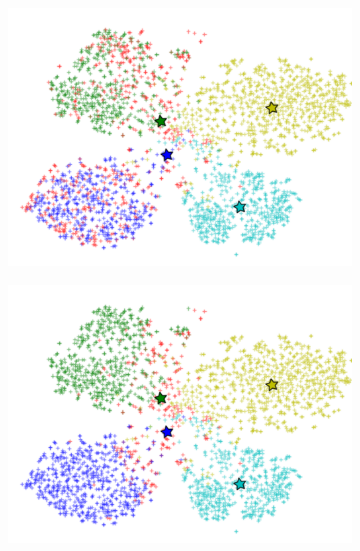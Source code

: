 \begin{figure}[t]
\begin{subfigure}[b]{0.38\linewidth}
    \includegraphics[width=\linewidth]{images/knn}
    \caption{}
\label{fig:knn}
  \end{subfigure}
%
  \begin{subfigure}[b]{0.38\linewidth}
    \includegraphics[width=\linewidth]{images/kmeans}
    \caption{}
\label{fig:kmeans}
  \end{subfigure}
%
  \begin{subfigure}[b]{0.38\linewidth}

\end{subfigure}
\end{figure}
